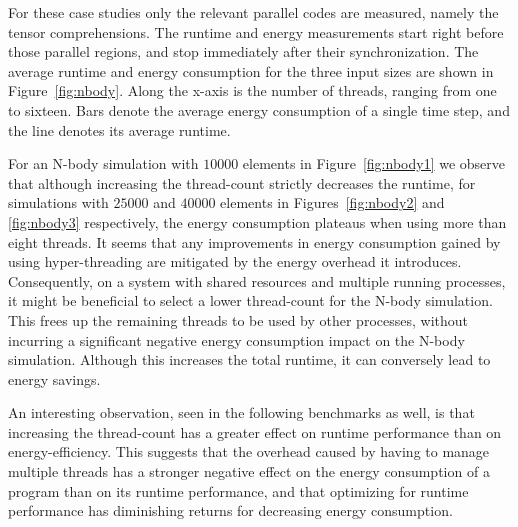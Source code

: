 For these case studies only the relevant parallel codes are measured, namely the tensor
comprehensions. The runtime and energy measurements start right before those parallel regions, and
stop immediately after their synchronization. The average runtime and energy consumption for the
three input sizes are shown in Figure~\ref{fig:nbody}. Along the x-axis is the number of threads,
ranging from one to sixteen. Bars denote the average energy consumption of a single time step, and
the line denotes its average runtime.

For an N-body simulation with $10000$ elements in Figure~\ref{fig:nbody1} we observe that although
increasing the thread-count strictly decreases the runtime, for simulations with $25000$ and $40000$
elements in Figures~\ref{fig:nbody2} and \ref{fig:nbody3} respectively, the energy consumption
plateaus when using more than eight threads. It seems that any improvements in energy consumption
gained by using hyper-threading are mitigated by the energy overhead it introduces. Consequently, on
a system with shared resources and multiple running processes, it might be beneficial to select a
lower thread-count for the N-body simulation. This frees up the remaining threads to be used by
other processes, without incurring a significant negative energy consumption impact on the N-body
simulation. Although this increases the total runtime, it can conversely lead to energy savings.

An interesting observation, seen in the following benchmarks as well, is that increasing the
thread-count has a greater effect on runtime performance than on energy-efficiency. This suggests
that the overhead caused by having to manage multiple threads has a stronger negative effect on the
energy consumption of a program than on its runtime performance, and that optimizing for runtime
performance has diminishing returns for decreasing energy consumption.

